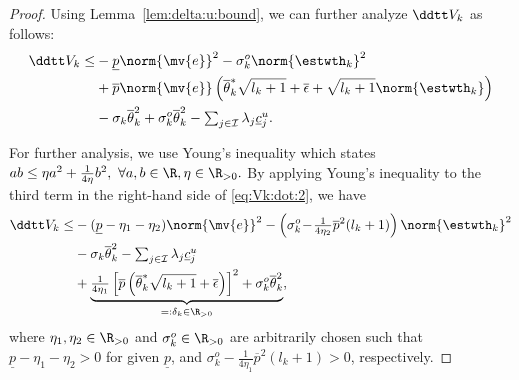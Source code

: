 \documentclass[letterpaper, journal]{IEEEtran}
\begin{document}
\begin{proof}
Using Lemma~\ref{lem:delta:u:bound}, we can further analyze $\ddtt V_{k}$ as follows:
\begin{align} \label{eq:Vk:dot:2} 
  \ddtt V_{k}
  \le&
    -\underline{p}
    \norm{\mv{e}}^2
    -
    \sigma_k^o
    \norm{\estwth_k}^2
  \\ \nonumber
  &
    +
    \overline{p}
    \norm{\mv{e}}
    \left(
      \overline{\theta}^*_k
      \sqrt{l_{k}+1}
      +
      \overline{\epsilon}
      +
      \sqrt{l_k+1}\norm{\estwth_k}
    \right)        
  \\ \nonumber
  &
    -
    \sigma_k 
    \overline{\theta}_k^2
    +
    \sigma_k^o 
    \overline{\theta}_k^2
    -
    \textstyle\sum_{j\in\mathcal{I}}
    \lambda_j
    \underline{c}_j^u
    .
\end{align}

For further analysis, we use Young's inequality which states 
$
  ab
  \le
  \eta a^2
  +
  \frac{1}{4\eta}b^2,
  \ 
  \forall a,b\in\R, \eta\in\R_{>0}
  .
$
By applying Young's inequality to the third term in the right-hand side of \eqref{eq:Vk:dot:2}, we have
\begin{align} \label{eq:Vk:dot:3} \nonumber
  \ddtt V_{k}
  \le &
    -(\underline{p}-\eta_1-\eta_2)
    \norm{\mv{e}}^2
    -
    \left(
      \sigma_k^o
      \!-\!
      \tfrac{1}{4\eta_2}
      \overline{p}^2
      (l_k+1)
    \right)
    \norm{\estwth_k}^2
  \\ 
  &
    -
    \sigma_k \overline{\theta}_k^2
    -
    \textstyle\sum_{j\in\mathcal{I}}
    \lambda_j
    \underline{c}_j^u
  \\ \nonumber
  &
      +
  \underbrace{
    \tfrac{1}{4\eta_1}
    \left[
    \overline{p}
      \left(
        \overline{\theta}_k^*
        \sqrt{l_{k}+1}
        +
        \overline{\epsilon}
      \right)
    \right]^2
    +
    \sigma_k^o
    \overline{\theta}_k^2
  }_{=: \delta_k \in \R_{>0}}
  ,
\end{align}
where $\eta_1,\eta_2\in\R_{>0}$ and $\sigma_k^o\in\R_{>0}$ are arbitrarily chosen such that $\underline{p}-\eta_1-\eta_2>0$ for given $\underline{p}$, and $\sigma_k^o - \frac{1}{4\eta_1} \overline{p}^2 (l_k+1) > 0$, respectively.


\end{proof}
\end{document}
